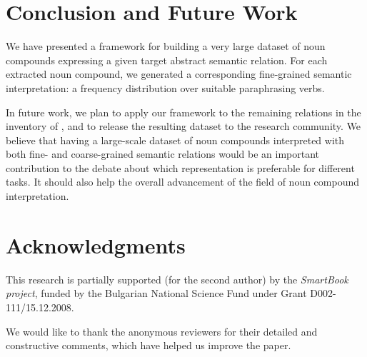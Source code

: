 \documentclass[letterpaper,11pt]{article}
\begin{document}
\section{Conclusion and Future Work}
\label{sec:conclusion}

We have  presented a framework  for building  a very large  dataset of
noun compounds  expressing a given target  abstract semantic relation.
For  each  extracted  noun  compound,  we  generated  a  corresponding
fine-grained  semantic interpretation:  a frequency  distribution over
suitable paraphrasing verbs.

In  future work,  we  plan to  apply our  framework  to the  remaining
relations in  the inventory of ,  and to release
the  resulting dataset  to  the research  community.  We believe  that
having a large-scale  dataset of noun compounds  interpreted with both
fine-  and coarse-grained  semantic  relations would  be an  important
contribution to  the debate  about which representation  is preferable
for different tasks. It should also help the overall advancement of the
field of noun compound interpretation.


\section*{Acknowledgments}

This research is partially supported (for the second author) by the \emph{SmartBook project}, funded by the Bulgarian National Science Fund under Grant D002-111/15.12.2008.

We would like to thank the anonymous
reviewers for their detailed and constructive
comments, which have helped us improve the paper.



\end{document}
